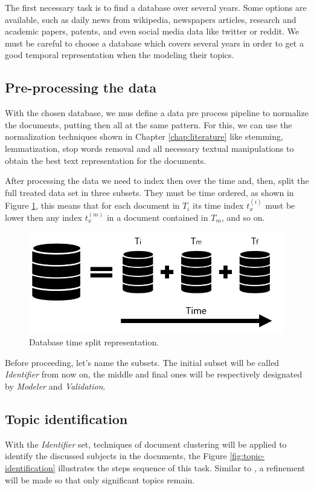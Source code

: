 The first necessary task is to find a database over several years. 
Some options are available, such as daily news from wikipedia, newspapers articles, research and academic papers, patents, and even social media data like twitter or reddit.
We must be careful to choose a database which covers several years in order to get a good temporal representation when the modeling their topics.

\subsection{Pre-processing the data}

With the chosen database, we mus define a data pre process pipeline to normalize the documents, putting then all at the same pattern. For this, we can use the normalization techniques shown in Chapter \ref{chap:literature} like stemming, lemmatization, stop words removal and all necessary textual manipulations to obtain the best text representation for the documents.

After processing the data we need to index then over the time and, then, split the full treated data set in three subsets. They must be time ordered, as shown in Figure \ref{fig:database}, this means that for each document in $T_{i}$ its time index $t_{x}^{(i)}$ must be lower then any index $t_{x}^{(m)}$ in a document contained in $T_{m}$, and so on.

\begin{figure}[h!]
	\centering
	\includegraphics[width=0.5\linewidth]{01.Chapters/04.Materials/database}
	\caption{Database time split representation.}
	\label{fig:database}
\end{figure}

Before proceeding, let's name the subsets. The initial subset will be called \textit{Identifier} from now on, the middle and final ones will be respectively designated by \textit{Modeler} and \textit{Validation}. 

\subsection{Topic identification}

With the \textit{Identifier} set, techniques of document clustering will be applied to identify the  discussed subjects in the documents, the Figure \ref{fig:topic-identification} illustrates the steps sequence of this task. Similar to , a refinement will be made so that only significant topics remain. 

